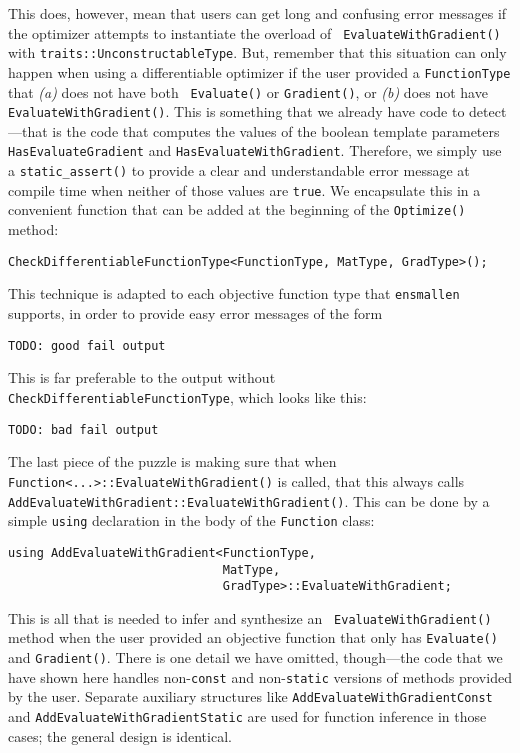 This does, however, mean that users can get long and confusing error messages if
the optimizer attempts to instantiate the overload of {\tt
EvaluateWithGradient()} with {\tt traits::UnconstructableType}.  But, remember
that this situation can only happen when using a differentiable optimizer if
the user provided a {\tt FunctionType} that {\it (a)} does not have both {\tt
Evaluate()} or {\tt Gradient()}, or {\it (b)} does not have {\tt
EvaluateWithGradient()}.  This is something that we already have code to
detect---that is the code that computes the values of the boolean template
parameters {\tt HasEvaluateGradient} and {\tt HasEvaluateWithGradient}.
Therefore, we simply use a {\tt static\_assert()} to provide a clear and
understandable error message at compile time when neither of those values are
{\tt true}.  We encapsulate this in a convenient function that can be added at
the beginning of the {\tt Optimize()} method:

\begin{verbatim}
CheckDifferentiableFunctionType<FunctionType, MatType, GradType>();
\end{verbatim}

This technique is adapted to each objective function type that {\tt ensmallen}
supports, in order to provide easy error messages of the form

\begin{verbatim}
TODO: good fail output
\end{verbatim}

This is far preferable to the output without {\tt
CheckDifferentiableFunctionType}, which looks like this:

\begin{verbatim}
TODO: bad fail output
\end{verbatim}

The last piece of the puzzle is making sure that when {\tt
Function<...>::EvaluateWithGradient()} is called, that this always calls {\tt
AddEvaluateWithGradient::EvaluateWithGradient()}.  This can be done by a simple
{\tt using} declaration in the body of the {\tt Function} class:

\begin{verbatim}
using AddEvaluateWithGradient<FunctionType,
                              MatType,
                              GradType>::EvaluateWithGradient;
\end{verbatim}

This is all that is needed to infer and synthesize an {\tt
EvaluateWithGradient()} method when the user provided an objective function that
only has {\tt Evaluate()} and {\tt Gradient()}.  There is one detail we have
omitted, though---the code that we have shown here handles non-{\tt const}
and non-{\tt static} versions of methods provided by the user.  Separate
auxiliary structures like {\tt AddEvaluateWithGradientConst} %
and {\tt AddEvaluateWithGradientStatic} %
are used for function inference in those cases; the general design is identical.

